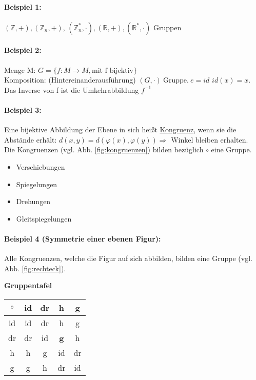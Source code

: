 \paragraph{Beispiel 1:}
$(\mathbb{Z},+), (\mathbb{Z}_n,+)$, $(\mathbb{Z}_n^* ,\cdot), (\mathbb{R},+), (\mathbb{R}^* ,\cdot)$ Gruppen

\paragraph{Beispiel 2:}
Menge M: $G = \{f \colon M \rightarrow M, \mbox{mit f bijektiv}\}$ \\
Komposition: (Hintereinanderausführung) $(G,\cdot) \ \mbox{Gruppe.} \ e=id$  $id(x)=x$. Das Inverse von f ist die Umkehrabbildung $f^{-1}$

\paragraph{Beispiel 3:}
Eine bijektive Abbildung der Ebene in sich heißt \underline{Kongruenz}, wenn sie die Abstände erhält: $ d(x,y) = d(\varphi(x), \varphi(y)) \Rightarrow$ Winkel bleiben erhalten. \\
Die Kongruenzen (vgl. Abb. \ref{fig:kongruenzen}) bilden bezüglich $\circ$ eine Gruppe.
\begin{itemize}
\item Verschiebungen
\item Spiegelungen
\item Drehungen
\item Gleitspiegelungen
\end{itemize}



\paragraph{Beispiel 4 (Symmetrie einer ebenen Figur):}
Alle Kongruenzen, welche die Figur auf sich abbilden, bilden eine Gruppe (vgl. Abb. \ref{fig:rechteck}). 




\textbf{Gruppentafel} \\
\begin{tabular}{|c|c|c|c|c|}
\hline $ \circ $ & id & dr & h & g \\ 
\hline id & id & dr & h & g \\ 
\hline dr & dr & id & \textbf{g} & h \\ 
\hline h & h & g & id & dr \\ 
\hline g & g & h & dr & id \\ 
\hline 
\end{tabular}
\\

